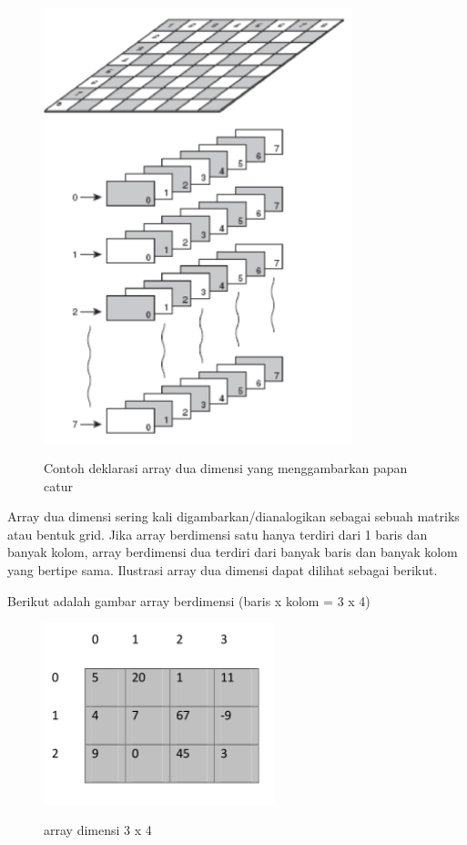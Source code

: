 \begin{figure}[htbp]
\centering
\includegraphics[width=0.8\textwidth]{../manuscript/images/capture3-11.PNG}
\label{gambar3-2}
\caption{Contoh deklarasi array dua dimensi yang menggambarkan papan catur}
\end{figure}

Array dua dimensi sering kali digambarkan/dianalogikan sebagai sebuah
matriks atau bentuk grid. Jika array berdimensi satu hanya terdiri dari
1 baris dan banyak kolom, array berdimensi dua terdiri dari banyak baris
dan banyak kolom yang bertipe sama. Ilustrasi array dua dimensi dapat
dilihat sebagai berikut.

Berikut adalah gambar array berdimensi (baris x kolom = 3 x 4)

\begin{figure}[htbp]
\centering
\includegraphics[width=0.6\textwidth]{../manuscript/images/capture3-12.PNG}
\label{gambar3-3}
\caption{array dimensi 3 x 4}
\end{figure}


